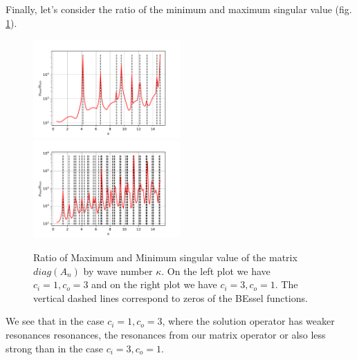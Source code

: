 \documentclass[10pt,journal,compsoc, onecolumn]{IEEEtran}
\begin{document}
Finally, let's consider the ratio of the minimum and maximum singular value (fig. \ref{fig:ratio_sing_val}).
\begin{figure}
    \includegraphics[width=0.5\textwidth]{scenario1Ratio.pdf}
    \includegraphics[width=0.5\textwidth]{scenario2Ratio.pdf}
    \caption{Ratio of Maximum and Minimum singular value of the matrix $diag(A_n)$ by wave number $\kappa$. 
    On the left plot we have $c_i = 1, c_o = 3$ 
    and on the right plot we have $c_i = 3, c_o = 1.$ The vertical dashed lines correspond to zeros of the BEssel functions. }
   \label{fig:ratio_sing_val}
\end{figure}
We see that in the case $c_i = 1, c_o =3$, where the solution operator has weaker resonances resonances, 
the resonances from our matrix operator or also less strong 
than in the case $c_i = 3, c_o =1$.


%
%
%
\end{document}
